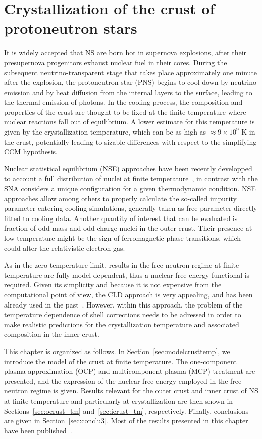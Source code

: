 \chapter{Crystallization of the crust of protoneutron stars}

It is widely accepted that NS are born hot in supernova 
explosions, after their presupernova progenitors exhaust nuclear fuel in their
cores. During the subsequent neutrino-transparent stage that takes place 
approximately one minute after the explosion, the protoneutron star (PNS) 
begins to cool down by neutrino emission and by heat diffusion from the 
internal layers to the surface, leading to the thermal emission of photons.
In the cooling process, the composition and properties of the crust are thought 
to be fixed at the finite temperature where nuclear reactions fall out of 
equilibrium. A lower estimate for this temperature is given by the 
crystallization temperature, which can be as high as $\approx 9\times 10^9$ K
in the crust, potentially leading to sizable differences with respect to
the simplifying CCM hypothesis.

Nuclear statistical equilibrium (NSE) approaches have been recently developped 
to account a full distribution of nuclei at finite 
temperature~\cite{Gulminelli2015}, in contrast with the SNA considers a unique
configuration for a given thermodynamic condition. NSE approaches allow among
others to properly calculate the so-called impurity parameter entering cooling
simulations, generally taken as free parameter directly fitted to cooling
data. Another quantity of interest that can be evaluated is fraction of 
odd-mass and odd-charge nuclei in the outer crust. Their presence at low
temperature might be the sign of ferromagnetic phase transitions, which could 
alter the relativistic electron gas.

As in the zero-temperature limit, results in the free neutron regime at
finite temperature are fully model dependent, thus a nuclear free energy
functional is required. Given its simplicity and because it is not expensive
from the computational point of view, the CLD approach is very appealing, and 
has been already used in the past~\cite{Gulminelli2015,Grams2018}. However,
within this approach, the problem of the temperature dependence of shell 
corrections needs to be adressed in order to make realistic predictions for the 
crystallization temperature and associated composition in the inner crust.

This chapter is organized as follows. In Section~\ref{sec:modelcrusttemp}, we
introduce the model of the crust at finite temperature. The one-component 
plasma approximation (OCP) and multicomponent plasma (MCP) treatment are
presented, and the expression of the nuclear free energy employed in the free
neutron regime is given. 
Results relevant for the outer crust and inner crust of NS at finite 
temperature and particularly at crystallization are then shown in 
Sections~\ref{sec:ocrust_tm} and~\ref{sec:icrust_tm}, respectively.
Finally, conclusions are given in Section~\ref{sec:conclu3}.
Most of the results presented in this chapter have been 
published~\cite{Fantina2020,Carreau2019,Carreau2020}.

